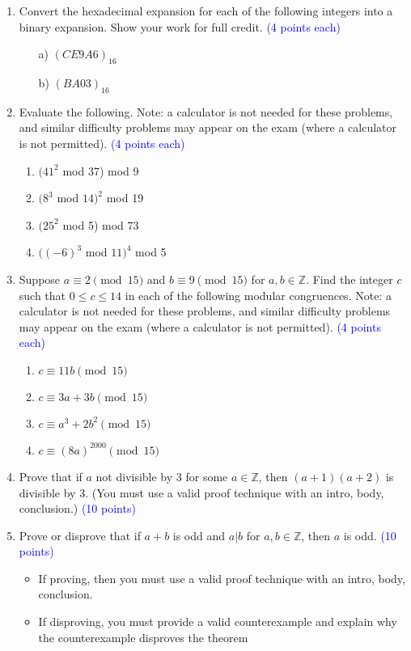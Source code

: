 \documentclass{article}
\newcommand{\pt}[1]{\textcolor{blue}{(#1 points)}}
\newcommand{\pte}[1]{\textcolor{blue}{(#1 points each)}}
\begin{document}
\begin{enumerate}
    \item Convert the hexadecimal expansion for each of the following integers into a binary expansion. Show your work for full credit. \pte{4}
\begin{enumerate}
    \item[a)] $(CE9A6)_{16}$
    \item[b)] $(BA03)_{16}$
\end{enumerate}

\item Evaluate the following. Note: a calculator is not needed for these problems, and similar difficulty problems
may appear on the exam (where a calculator is not permitted). \pte{4}
\begin{enumerate}
    \item $(41^2$ mod 37) mod 9
    \item $(8^3$ mod $14)^2$ mod 19
    \item $(25^2$ mod 5) mod 73
    \item $((-6)^3$ mod $11)^4$ mod 5
\end{enumerate}

\item Suppose $a \equiv 2 \pmod{15}$ and $b \equiv 9 \pmod{15}$ for $a,b \in \mathbb{Z}$. Find the integer $c$ such that $0 \leq c \leq 14$ in
each of the following modular congruences. Note: a calculator is not needed for these problems, and similar
difficulty problems may appear on the exam (where a calculator is not permitted). \pte{4}
\begin{enumerate}
    \item $c \equiv 11b \pmod{15}$
    \item $ c \equiv 3a +3b \pmod{15}$
    \item $c \equiv a^3 +2b^2 \pmod{15}$
    \item $c \equiv (8a)^{2000} \pmod{15}$
\end{enumerate}

\item Prove that if $a$ not divisible by 3 for some $a \in \mathbb{Z}$, then $(a+1)(a+2)$ is divisible by 3. (You must use a valid proof technique with an intro, body, conclusion.) \pt{10}

\item Prove or disprove that if $a + b$ is odd and $a|b$ for $a,b \in \mathbb{Z}$, then $a$ is odd. \pt{10}
\begin{itemize}
    \item If proving, then you must use a valid proof technique with an intro, body, conclusion.  
    \item If disproving, you must provide a valid counterexample and explain why the counterexample disproves the theorem
    
\end{itemize}


\end{enumerate}
\end{document}
